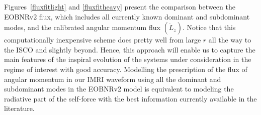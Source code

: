 Figures~\ref{fluxfitlight} and \ref{fluxfitheavy} present the comparison between the EOBNRv2 flux, which includes all currently known dominant and subdominant modes, and the calibrated angular momentum flux \(\left(\dot L_z\right)\). Notice that this computationally inexpensive scheme does pretty well from large \(r\) all the way to the ISCO and slightly beyond. Hence, this approach will enable us to capture the main features of the inspiral evolution of the systems under consideration in the regime of interest with good accuracy. Modelling the prescription of the flux of angular momentum in our IMRI waveform using all the dominant and subdominant modes in the EOBNRv2 model is equivalent to modeling the radiative part of the self-force with the best information currently available in the literature. 



